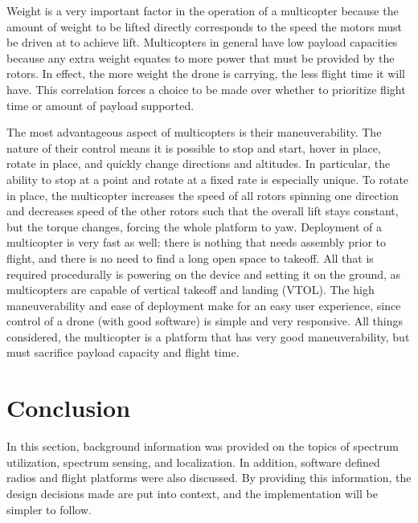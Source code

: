 Weight is a very important factor in the operation of a multicopter because the amount of weight to be lifted directly corresponds to the speed the motors must be driven at to achieve lift. Multicopters in general have low payload capacities because any extra weight equates to more power that must be provided by the rotors. In effect, the more weight the drone is carrying, the less flight time it will have. This correlation forces a choice to be made over whether to prioritize flight time or amount of payload supported.\par
The most advantageous aspect of multicopters is their maneuverability. The nature of their control means it is possible to stop and start, hover in place, rotate in place, and quickly change directions and altitudes. In particular, the ability to stop at a point and rotate at a fixed rate is especially unique. To rotate in place, the multicopter increases the speed of all rotors spinning one direction and decreases speed of the other rotors such that the overall lift stays constant, but the torque changes, forcing the whole platform to yaw.\cite{multicopter_dynamics} Deployment of a multicopter is very fast as well: there is nothing that needs assembly prior to flight, and there is no need to find a long open space to takeoff. All that is required procedurally  is powering on the device and setting it on the ground, as multicopters are capable of vertical takeoff and landing (VTOL). The high maneuverability and ease of deployment make for an easy user experience, since control of a drone (with good software) is simple and very responsive. All things considered, the multicopter is a platform that has very good maneuverability, but must sacrifice payload capacity and flight time.

\section{Conclusion}
In this section, background information was provided on the topics of spectrum utilization, spectrum sensing, and localization. In addition, software defined radios and flight platforms were also discussed.  By providing this information, the design decisions made are put into context, and the implementation will be simpler to follow.